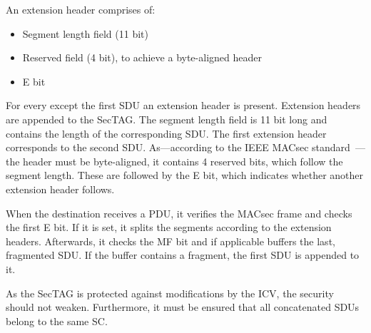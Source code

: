 An extension header comprises of:
\begin{itemize}
  \item Segment length field (11 bit)
  \item Reserved field (4 bit), to achieve a byte-aligned header
  \item \acrlong{E} bit
\end{itemize}

For every except the first \gls{SDU} an extension header is present.
Extension headers are appended to the \gls{SecTAG}.
The segment length field is 11 bit long and contains the length of the corresponding \gls{SDU}.
The first extension header corresponds to the second \gls{SDU}.
As---according to the \gls{IEEE} \gls{MACsec} standard~\cite{macsec}---the header must be byte-aligned, it contains 4 reserved bits, which follow the segment length.
These are followed by the \gls{E} bit, which indicates whether another extension header follows.

When the destination receives a \gls{PDU}, it verifies the \gls{MACsec} frame and checks the first \gls{E} bit.
If it is set, it splits the segments according to the extension headers.
Afterwards, it checks the \gls{MF} bit and if applicable buffers the last, fragmented \gls{SDU}.
If the buffer contains a fragment, the first \gls{SDU} is appended to it.

As the \gls{SecTAG} is protected against modifications by the \gls{ICV}, the security should not weaken.
Furthermore, it must be ensured that all concatenated \glspl{SDU} belong to the same \acrfull{SC}.

